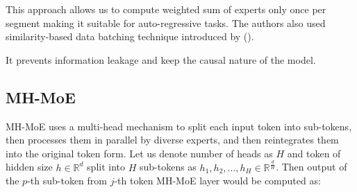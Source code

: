 \documentclass[12pt]{article}
\begin{document}
This approach allows us to compute weighted sum of experts only once per segment making it suitable for auto-regressive tasks. The authors also used similarity-based data batching technique introduced by (\cite{shi2023context}). 

%
It prevents information leakage and keep the causal nature of the model.




\subsection{MH-MoE}



MH-MoE uses a multi-head mechanism to split each input token into sub-tokens, then processes them in parallel by diverse experts, and then reintegrates them into the original token form. Let us denote number of heads as $H$ and token of hidden size $h \in \mathbb{R}^d $ split into $H$ sub-tokens as $h_1,h_2,...,h_H \in \mathbb{R}^{\frac{d}{H}} $. Then output of the $p$-th sub-token from $j$-th token MH-MoE layer would be computed as:
\end{document}
